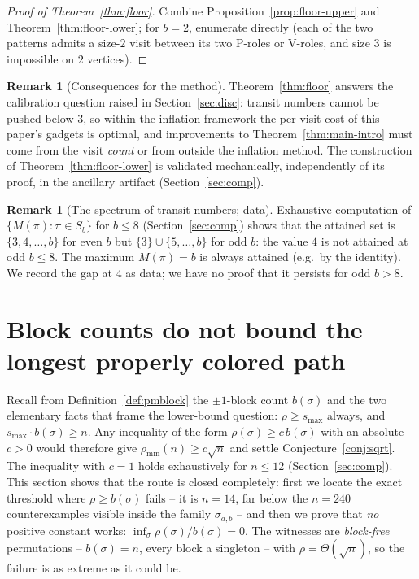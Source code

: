 \documentclass[11pt]{article}
\theoremstyle{definition}
\newtheorem{remark}[theorem]{Remark}
\newcommand{\pmin}{\rho_{\min}}
\newcommand{\smax}{s_{\max}}
\begin{document}
\begin{proof}[Proof of Theorem~\ref{thm:floor}]
Combine Proposition~\ref{prop:floor-upper} and Theorem~\ref{thm:floor-lower}; for
$b = 2$, enumerate directly (each of the two patterns admits a size-$2$ visit between
its two P-roles or V-roles, and size $3$ is impossible on $2$ vertices).
\end{proof}

\begin{remark}[Consequences for the method]\label{rem:floor-consequences}
Theorem~\ref{thm:floor} answers the calibration question raised in
Section~\ref{sec:disc}: transit numbers cannot be pushed below $3$, so within the
inflation framework the per-visit cost of this paper's gadgets is optimal, and
improvements to Theorem~\ref{thm:main-intro} must come from the visit \emph{count} or
from outside the inflation method. The construction of
Theorem~\ref{thm:floor-lower} is validated mechanically, independently of its proof,
in the ancillary artifact (Section~\ref{sec:comp}).
\end{remark}

\begin{remark}[The spectrum of transit numbers; data]\label{rem:spectrum}
Exhaustive computation of $\{M(\pi) : \pi \in S_b\}$ for $b \le 8$
(Section~\ref{sec:comp}) shows that the attained set is $\{3, 4, \dots, b\}$ for even
$b$ but $\{3\} \cup \{5, \dots, b\}$ for odd $b$: the value $4$ is not attained at
odd $b \le 8$. The maximum $M(\pi) = b$ is always attained (e.g.\ by the identity). We
record the gap at $4$ as data; we have no proof that it persists for odd $b > 8$.
\end{remark}

\section{Block counts do not bound the longest properly colored path}
\label{sec:blockfail}

Recall from Definition~\ref{def:pmblock} the $\pm1$-block count $b(\sigma)$ and the
two elementary facts that frame the lower-bound question: $\rho \ge \smax$ always, and
$\smax \cdot b(\sigma) \ge n$. Any inequality of the form
$\rho(\sigma) \ge c\, b(\sigma)$ with an absolute $c > 0$ would therefore give
$\pmin(n) \ge c\sqrt n$ and settle Conjecture~\ref{conj:sqrt}. The inequality with
$c = 1$ holds exhaustively for $n \le 12$ (Section~\ref{sec:comp}). This section shows
that the route is closed completely: first we locate the exact threshold where
$\rho \ge b(\sigma)$ fails -- it is $n = 14$, far below the $n = 240$ counterexamples
visible inside the family $\sigma_{a,b}$ -- and then we prove that
\emph{no} positive constant works:
$\inf_\sigma \rho(\sigma)/b(\sigma) = 0$. The witnesses are \emph{block-free}
permutations -- $b(\sigma) = n$, every block a singleton -- with
$\rho = \Theta(\sqrt n)$, so the failure is as extreme as it could be.
\end{document}
